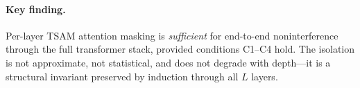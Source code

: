 \paragraph{Key finding.}
Per-layer TSAM attention masking is \emph{sufficient} for end-to-end
noninterference through the full transformer stack, provided conditions
C1--C4 hold.  The isolation is not approximate, not statistical, and does
not degrade with depth---it is a structural invariant preserved by induction
through all $L$ layers.
